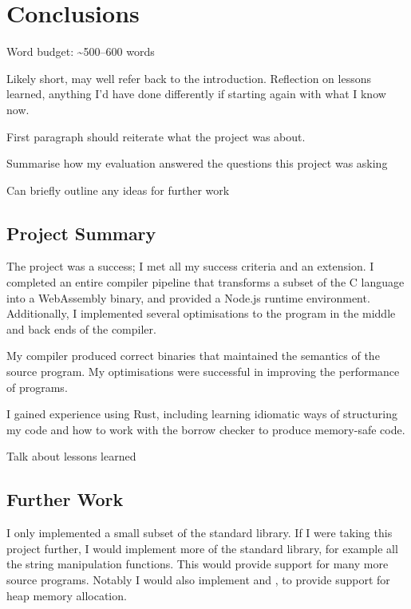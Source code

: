 \documentclass[00-main.tex]{subfiles}
\begin{document}
\chapter{Conclusions}

\begin{mrwComment}
Word budget: \textasciitilde 500--600 words
\end{mrwComment}

\begin{mrwComment}
Likely short, may well refer back to the introduction. Reflection on lessons learned, anything I'd have done differently if starting again with what I know now.

First paragraph should reiterate what the project was about.

Summarise how my evaluation answered the questions this project was asking

Can briefly outline any ideas for further work
\end{mrwComment}

\section{Project Summary}

The project was a success; I met all my success criteria and an extension.
I completed an entire compiler pipeline that transforms a subset of the C language into a WebAssembly binary, and provided a Node.js runtime environment.
Additionally, I implemented several optimisations to the program in the middle and back ends of the compiler.

My compiler produced correct binaries that maintained the semantics of the source program.
My optimisations were successful in improving the performance of programs.

I gained experience using Rust, including learning idiomatic ways of structuring my code and how to work with the borrow checker to produce memory-safe code.

\begin{mrwComment}
Talk about lessons learned
\end{mrwComment}

\section{Further Work}

I only implemented a small subset of the standard library.
If I were taking this project further, I would implement more of the standard library, for example all the string manipulation functions.
This would provide support for many more source programs.
Notably I would also implement  and , to provide support for heap memory allocation.
\end{document}
